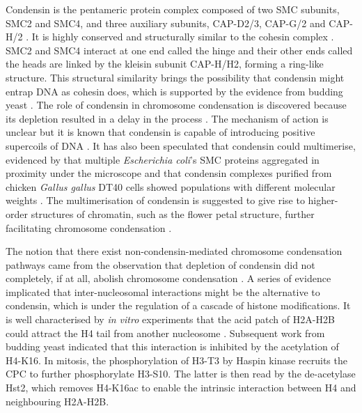 Condensin is the pentameric protein complex composed of two SMC subunits, SMC2 and SMC4, and three auxiliary subunits, CAP-D2/3, CAP-G/2 and CAP-H/2 \citep{Hirano2012Condensins:Functions, Kalitsis2017CondensinGenome}. It is highly conserved and structurally similar to the cohesin complex \citep{Davidson2021GenomeComplexes}. SMC2 and SMC4 interact at one end called the hinge and their other ends called the heads are linked by the kleisin subunit CAP-H/H2, forming a ring-like structure. This structural similarity brings the possibility that condensin might entrap DNA as cohesin does, which is supported by the evidence from budding yeast \citep{Cuylen2011CondensinLinks, Ganji2018Real-timeCondensin}. The role of condensin in chromosome condensation is discovered because its depletion resulted in a delay in the process \citep{Hagstrom2002C.Meiosis, Kaitna2002TheMeiosis, Hudson2003CondensinChromosomes}. The mechanism of action is unclear but it is known that condensin is capable of introducing positive supercoils of DNA \citep{Hirano2012Condensins:Functions}. It has also been speculated that condensin could multimerise, evidenced by that multiple \textit{Escherichia coli}'s SMC proteins aggregated in proximity under the microscope \citep{Badrinarayanan2012InProteins} and that condensin complexes purified from chicken \textit{Gallus gallus} DT40 cells showed populations with different molecular weights \citep{Barysz2015Three-dimensionalModelling}. The multimerisation of condensin is suggested to give rise to higher-order structures of chromatin, such as the flower petal structure, further facilitating chromosome condensation \citep{Piskadlo2016NovelCondensation, Kalitsis2017CondensinGenome}. 

The notion that there exist non-condensin-mediated chromosome condensation pathways came from the observation that depletion of condensin did not completely, if at all, abolish chromosome condensation \citep{Hudson1998CentromereWeights, Gerlich2006CondensinCells, Vagnarelli2006CondensinMitosisb, Kireeva2004VisualizationStructure, Hagstrom2002C.Meiosis}. A series of evidence implicated that inter-nucleosomal interactions might be the alternative to condensin, which is under the regulation of a cascade of histone modifications. It is well characterised by \textit{in vitro} experiments that the acid patch of H2A-H2B could attract the H4 tail from another nucleosome \citep{Robinson200830nmEviction, Shogren-Knaak2006HistoneInteractions}. Subsequent work from budding yeast \citep{Wilkins2014AMitosis, Kruitwagen2015a} indicated that this interaction is inhibited by the acetylation of H4-K16. In mitosis, the phosphorylation of H3-T3 by Haspin kinase recruits the CPC to further phosphorylate H3-S10. The latter is then read by the de-acetylase Hst2, which removes H4-K16ac to enable the intrinsic interaction between H4 and neighbouring H2A-H2B. 

